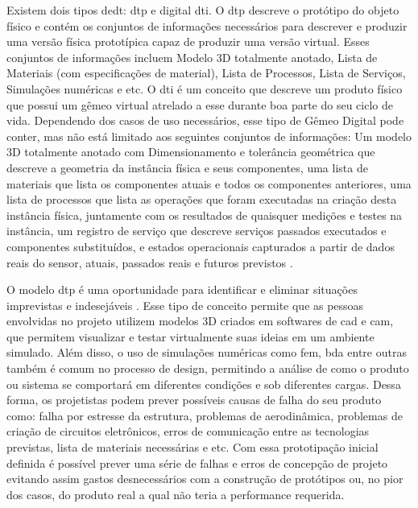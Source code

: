 Existem dois tipos de\acrlong{dt}: \acrlong{dtp} e digital \acrlong{dti}. O \acrshort{dtp} descreve o protótipo do objeto físico e contém os conjuntos de informações necessários para descrever e produzir uma versão física prototípica capaz de produzir uma versão virtual.  Esses conjuntos de informações incluem Modelo 3D totalmente anotado, Lista de Materiais (com especificações de material), Lista de Processos, Lista de Serviços, Simulações numéricas e etc.  O \acrshort{dti}  é um conceito que descreve um produto físico que possui um gêmeo virtual atrelado a esse durante boa parte do seu ciclo de vida. Dependendo dos casos de uso necessários, esse tipo de Gêmeo Digital pode conter, mas não está limitado aos seguintes conjuntos de informações: Um modelo 3D totalmente anotado com Dimensionamento e tolerância geométrica que descreve a geometria da instância física e seus componentes, uma lista de materiais que lista os componentes atuais e todos os componentes anteriores, uma lista de processos que lista as operações que foram executadas na criação desta instância física, juntamente com os resultados de quaisquer medições e testes na instância, um registro de serviço que descreve serviços passados executados e componentes substituídos, e estados operacionais capturados a partir de dados reais do sensor, atuais, passados reais e futuros previstos \cite{Grieves2017}. 

  

O modelo \acrshort{dtp}  é uma oportunidade para identificar e eliminar situações imprevistas e indesejáveis \cite{Grieves2017}. Esse tipo de conceito permite que as pessoas envolvidas no projeto utilizem modelos 3D criados em softwares de \acrfull{cad} e \acrfull{cam}, que permitem visualizar e testar virtualmente suas ideias em um ambiente simulado. Além disso, o uso de simulações numéricas como \acrfull{fem}, \acrfull{bda} entre outras também é comum no processo de design, permitindo a análise de como o produto ou sistema se comportará em diferentes condições e sob diferentes cargas. Dessa forma, os projetistas podem prever possíveis causas de falha do seu produto como: falha por estresse da estrutura, problemas de aerodinâmica, problemas de criação de circuitos eletrônicos, erros de comunicação entre as tecnologias previstas, lista de materiais necessárias e etc. Com essa prototipação inicial definida é possível prever uma série de falhas e erros de concepção de projeto evitando assim gastos desnecessários com a construção de protótipos ou, no pior dos casos, do produto real a qual não teria a performance requerida. 

